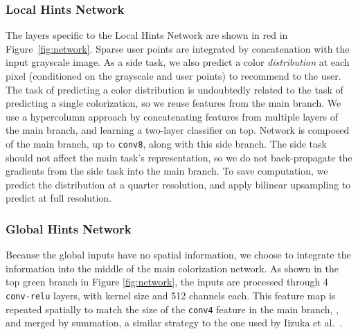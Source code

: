 \documentclass[acmtog,authorversion]{acmart}
\begin{document}
\subsubsection{Local Hints Network} The layers specific to the Local Hints Network are shown in red in Figure~\ref{fig:network}. Sparse user points are integrated by concatenation with the input grayscale image. As a side task, we also predict a color \textit{distribution} at each pixel (conditioned on the grayscale and user points) to recommend to the user. The task of predicting a color distribution is undoubtedly related to the task of predicting a single colorization, so we reuse features from the main branch. We use a hypercolumn approach \cite{hariharan2015hypercolumns,larsson2016learning} by concatenating features from multiple layers of the main branch, and learning a two-layer classifier on top. Network  is composed of the main branch, up to \texttt{conv8}, along with this side branch. The side task should not affect the main task's representation, so we do not back-propagate the gradients from the side task into the main branch. To save computation, we predict the distribution at a quarter resolution, and apply bilinear upsampling to predict at full resolution.

\subsubsection{Global Hints Network} Because the global inputs have no spatial information, we choose to integrate the information into the middle of the main colorization network. As shown in the top green branch in Figure \ref{fig:network}, the inputs are processed through 4 \texttt{conv-relu} layers, with kernel size  and 512 channels each. This feature map is repeated spatially to match the size of the \texttt{conv4} feature in the main branch, , and merged by summation, a similar strategy to the one used by Iizuka et al.~.
\end{document}
